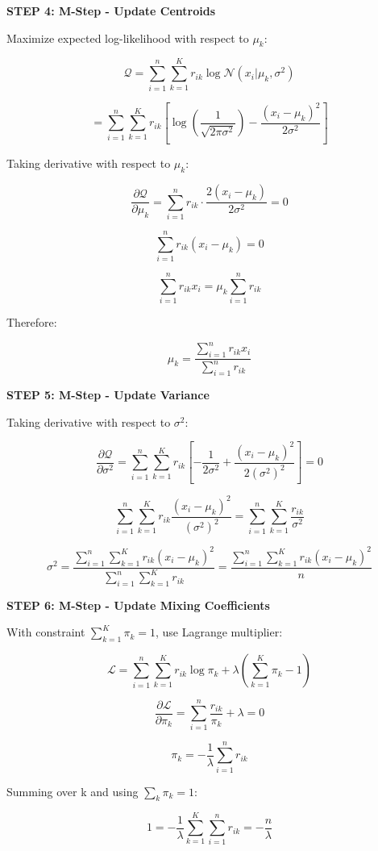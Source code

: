 \documentclass[12pt]{article}
\begin{document}
\begin{solution}
\textbf{STEP 4: M-Step - Update Centroids}

Maximize expected log-likelihood with respect to $\mu_k$:

\[
\mathcal{Q} = \sum_{i=1}^n \sum_{k=1}^K r_{ik} \log \mathcal{N}(x_i | \mu_k, \sigma^2)
\]

\[
= \sum_{i=1}^n \sum_{k=1}^K r_{ik} \left[\log\left(\frac{1}{\sqrt{2\pi\sigma^2}}\right) - \frac{(x_i - \mu_k)^2}{2\sigma^2}\right]
\]

Taking derivative with respect to $\mu_k$:

\[
\frac{\partial \mathcal{Q}}{\partial \mu_k} = \sum_{i=1}^n r_{ik} \cdot \frac{2(x_i - \mu_k)}{2\sigma^2} = 0
\]

\[
\sum_{i=1}^n r_{ik}(x_i - \mu_k) = 0
\]

\[
\sum_{i=1}^n r_{ik} x_i = \mu_k \sum_{i=1}^n r_{ik}
\]

Therefore:

\[
\mu_k = \frac{\sum_{i=1}^n r_{ik} x_i}{\sum_{i=1}^n r_{ik}}
\]

\textbf{STEP 5: M-Step - Update Variance}

Taking derivative with respect to $\sigma^2$:

\[
\frac{\partial \mathcal{Q}}{\partial \sigma^2} = \sum_{i=1}^n \sum_{k=1}^K r_{ik} \left[-\frac{1}{2\sigma^2} + \frac{(x_i - \mu_k)^2}{2(\sigma^2)^2}\right] = 0
\]

\[
\sum_{i=1}^n \sum_{k=1}^K r_{ik} \frac{(x_i - \mu_k)^2}{(\sigma^2)^2} = \sum_{i=1}^n \sum_{k=1}^K \frac{r_{ik}}{\sigma^2}
\]

\[
\sigma^2 = \frac{\sum_{i=1}^n \sum_{k=1}^K r_{ik}(x_i - \mu_k)^2}{\sum_{i=1}^n \sum_{k=1}^K r_{ik}} = \frac{\sum_{i=1}^n \sum_{k=1}^K r_{ik}(x_i - \mu_k)^2}{n}
\]

\textbf{STEP 6: M-Step - Update Mixing Coefficients}

With constraint $\sum_{k=1}^K \pi_k = 1$, use Lagrange multiplier:

\[
\mathcal{L} = \sum_{i=1}^n \sum_{k=1}^K r_{ik} \log \pi_k + \lambda\left(\sum_{k=1}^K \pi_k - 1\right)
\]

\[
\frac{\partial \mathcal{L}}{\partial \pi_k} = \sum_{i=1}^n \frac{r_{ik}}{\pi_k} + \lambda = 0
\]

\[
\pi_k = -\frac{1}{\lambda}\sum_{i=1}^n r_{ik}
\]

Summing over k and using $\sum_k \pi_k = 1$:

\[
1 = -\frac{1}{\lambda}\sum_{k=1}^K \sum_{i=1}^n r_{ik} = -\frac{n}{\lambda}
\]


\end{solution}
\end{document}
